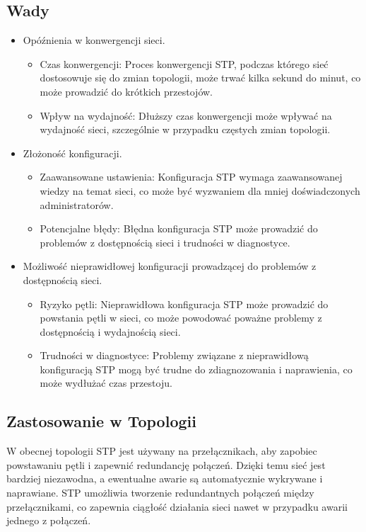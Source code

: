 \subsection{Wady}
\begin{itemize}
    \item Opóźnienia w konwergencji sieci.
    \begin{itemize}
        \item Czas konwergencji: Proces konwergencji STP, podczas którego sieć dostosowuje się do zmian topologii, może trwać kilka sekund do minut, co może prowadzić do krótkich przestojów.
        \item Wpływ na wydajność: Dłuższy czas konwergencji może wpływać na wydajność sieci, szczególnie w przypadku częstych zmian topologii.
    \end{itemize}
    \item Złożoność konfiguracji.
    \begin{itemize}
        \item Zaawansowane ustawienia: Konfiguracja STP wymaga zaawansowanej wiedzy na temat sieci, co może być wyzwaniem dla mniej doświadczonych administratorów.
        \item Potencjalne błędy: Błędna konfiguracja STP może prowadzić do problemów z dostępnością sieci i trudności w diagnostyce.
    \end{itemize}
    \item Możliwość nieprawidłowej konfiguracji prowadzącej do problemów z dostępnością sieci.
    \begin{itemize}
        \item Ryzyko pętli: Nieprawidłowa konfiguracja STP może prowadzić do powstania pętli w sieci, co może powodować poważne problemy z dostępnością i wydajnością sieci.
        \item Trudności w diagnostyce: Problemy związane z nieprawidłową konfiguracją STP mogą być trudne do zdiagnozowania i naprawienia, co może wydłużać czas przestoju.
    \end{itemize}
\end{itemize}

\subsection{Zastosowanie w Topologii}
W obecnej topologii STP jest używany na przełącznikach, aby zapobiec powstawaniu pętli i zapewnić redundancję połączeń. Dzięki temu sieć jest bardziej niezawodna, a ewentualne awarie są automatycznie wykrywane i naprawiane. STP umożliwia tworzenie redundantnych połączeń między przełącznikami, co zapewnia ciągłość działania sieci nawet w przypadku awarii jednego z połączeń.

